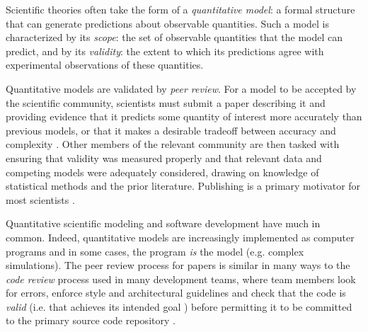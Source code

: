 \documentclass[9pt]{sig-alternate}
\begin{document}
Scientific theories often take the form of a \emph{quantitative model}: a formal structure that can generate predictions about observable quantities. Such a model is characterized by its \textit{scope}: the set of observable quantities that the model can predict, and by its \textit{validity}: the extent to which its predictions agree with experimental observations of these quantities. 

Quantitative models are validated by \emph{peer review}. For a model to be accepted by the scientific community, scientists must submit a paper describing it and providing  evidence that it predicts some quantity of interest more accurately than previous models, or that it makes a desirable tradeoff  between accuracy and complexity \cite{box}. Other members of the relevant community are then tasked with ensuring that validity was measured properly and that relevant data and competing models were adequately considered, drawing on knowledge of statistical methods and the prior literature. Publishing is a primary motivator for most scientists \cite{howison2011scientific}.

Quantitative scientific modeling and software development have much in common. Indeed, quantitative models are increasingly  implemented as computer programs and in some cases, the program \emph{is} the model (e.g. complex simulations). The peer review process for papers is similar in many ways to the \emph{code review} process used in many development teams, where team members look for errors, enforce style and architectural guidelines and check that the code is \emph{valid} (i.e. that achieves its intended goal \cite{validity}) before permitting it to be committed to the primary source code repository \cite{codereview}. 
\end{document}
